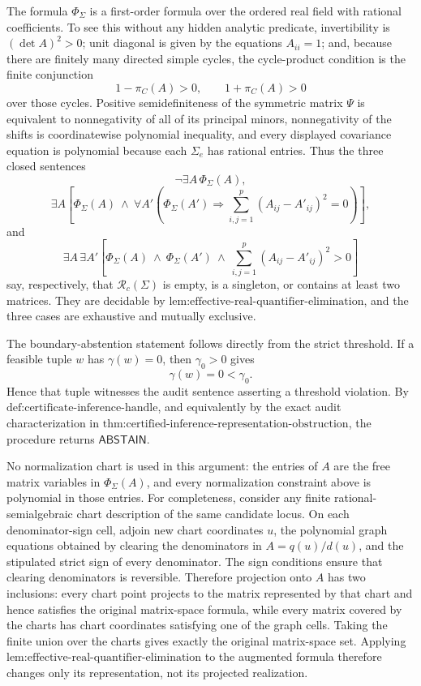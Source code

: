 The formula \(\Phi_\Sigma\) is a first-order formula over the ordered real field with rational coefficients.  To see this without any hidden analytic predicate, invertibility is \((\det A)^2>0\); unit diagonal is given by the equations \(A_{ii}=1\); and, because there are finitely many directed simple cycles, the cycle-product condition is the finite conjunction
\[
1-\pi_C(A)>0,
\qquad
1+\pi_C(A)>0
\]
over those cycles.  Positive semidefiniteness of the symmetric matrix \(\Psi\) is equivalent to nonnegativity of all of its principal minors, nonnegativity of the shifts is coordinatewise polynomial inequality, and every displayed covariance equation is polynomial because each \(\Sigma_e\) has rational entries.  Thus the three closed sentences
\[
\neg\exists A\,\Phi_\Sigma(A),
\]
\[
\exists A\left[
\Phi_\Sigma(A)\ \wedge\
\forall A'\left(
\Phi_\Sigma(A')\Longrightarrow
\sum_{i,j=1}^p(A_{ij}-A'_{ij})^2=0
\right)
\right],
\]
and
\[
\exists A\,\exists A'\left[
\Phi_\Sigma(A)\ \wedge\ \Phi_\Sigma(A')\ \wedge\
\sum_{i,j=1}^p(A_{ij}-A'_{ij})^2>0
\right]
\]
say, respectively, that \(\mathcal R_c(\Sigma)\) is empty, is a singleton, or contains at least two matrices.  They are decidable by \(\text{lem:effective-real-quantifier-elimination}\), and the three cases are exhaustive and mutually exclusive.

The boundary-abstention statement follows directly from the strict threshold.  If a feasible tuple \(w\) has \(\gamma(w)=0\), then \(\gamma_0>0\) gives
\[
\gamma(w)=0<\gamma_0.
\]
Hence that tuple witnesses the audit sentence asserting a threshold violation.  By \(\text{def:certificate-inference-handle}\), and equivalently by the exact audit characterization in \(\text{thm:certified-inference-representation-obstruction}\), the procedure returns \(\mathsf{ABSTAIN}\).

No normalization chart is used in this argument: the entries of \(A\) are the free matrix variables in \(\Phi_\Sigma(A)\), and every normalization constraint above is polynomial in those entries.  For completeness, consider any finite rational-semialgebraic chart description of the same candidate locus.  On each denominator-sign cell, adjoin new chart coordinates \(u\), the polynomial graph equations obtained by clearing the denominators in \(A=q(u)/d(u)\), and the stipulated strict sign of every denominator.  The sign conditions ensure that clearing denominators is reversible.  Therefore projection onto \(A\) has two inclusions: every chart point projects to the matrix represented by that chart and hence satisfies the original matrix-space formula, while every matrix covered by the charts has chart coordinates satisfying one of the graph cells.  Taking the finite union over the charts gives exactly the original matrix-space set.  Applying \(\text{lem:effective-real-quantifier-elimination}\) to the augmented formula therefore changes only its representation, not its projected realization.

